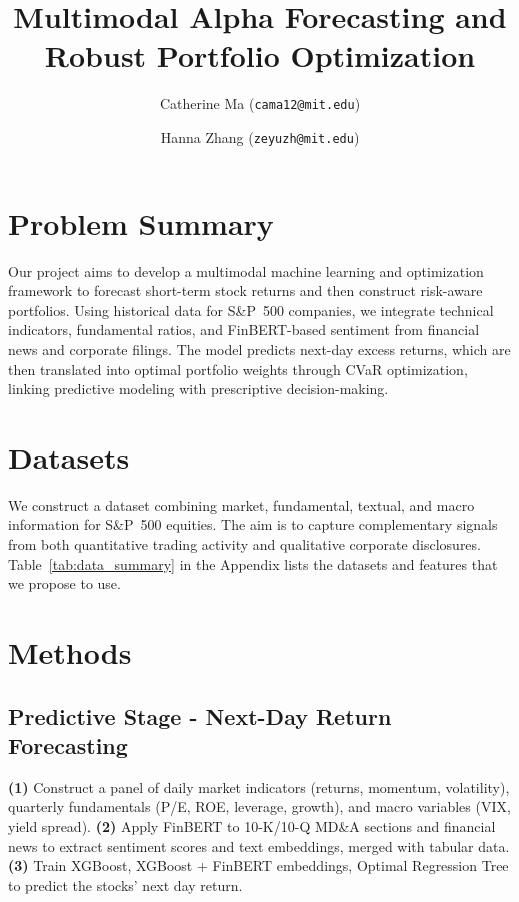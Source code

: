 \documentclass[11pt]{article}
\title{\vspace{-1.2cm} %
\bfseries\Large Multimodal Alpha Forecasting and Robust Portfolio Optimization}
\author[]{Catherine Ma (\texttt{cama12@mit.edu})}
\author[]{Hanna Zhang (\texttt{zeyuzh@mit.edu})}
\affil[]{}
\date{} %
\begin{document}
\maketitle
\vspace{-1.2cm} %

\section{Problem Summary}
Our project aims to develop a multimodal machine learning and optimization framework to forecast short-term stock returns and then construct risk-aware portfolios. Using historical data for S\&P~500 companies, we integrate technical indicators, fundamental ratios, and FinBERT-based sentiment from financial news and corporate filings. The model predicts next-day excess returns, which are then translated into optimal portfolio weights through CVaR optimization, linking predictive modeling with prescriptive decision-making.

\section{Datasets}

We construct a dataset combining market, fundamental, textual, and macro information for S\&P~500 equities. The aim is to capture complementary signals from both quantitative trading activity and qualitative corporate disclosures. Table~\ref{tab:data_summary} in the Appendix lists the datasets and features that we propose to use.



\section{Methods}

\subsection*{Predictive Stage - Next-Day Return Forecasting}
\textbf{(1)}  Construct a panel of daily market indicators (returns, momentum, volatility), quarterly fundamentals (P/E, ROE, leverage, growth), and macro variables (VIX, yield spread).  \textbf{(2)} Apply FinBERT to 10-K/10-Q MD\&A sections and financial news to extract sentiment scores and text embeddings, merged with tabular data. \textbf{(3)} Train XGBoost, XGBoost + FinBERT embeddings, Optimal Regression Tree to predict the stocks' next day return.
\end{document}
